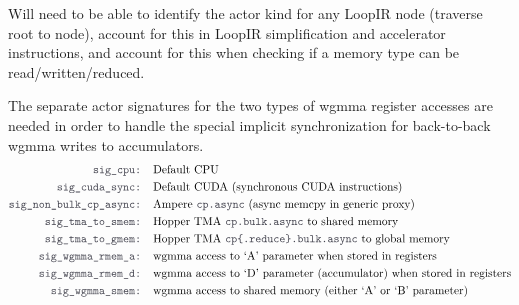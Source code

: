 \filbreak
{} Will need to be able to identify the actor kind for any LoopIR node (traverse root to node), account for this in LoopIR simplification and accelerator instructions, and account for this when checking if a memory type can be read/written/reduced.

\filbreak
{} The separate actor signatures for the two types of wgmma register accesses are needed in order to handle the special implicit synchronization for back-to-back wgmma writes to accumulators.
\begin{align*}
\lighttt{sig\_cpu: } & \text{Default CPU}\\
\lighttt{sig\_cuda\_sync: } & \text{Default CUDA (synchronous CUDA instructions)}\\
\lighttt{sig\_non\_bulk\_cp\_async: } & \text{Ampere \lighttt{cp.async} (async memcpy in generic proxy)}\\
\lighttt{sig\_tma\_to\_smem: } & \text{Hopper TMA \lighttt{cp.bulk.async} to shared memory}\\
\lighttt{sig\_tma\_to\_gmem: } & \text{Hopper TMA \lighttt{cp\{.reduce\}.bulk.async} to global memory}\\
\lighttt{sig\_wgmma\_rmem\_a: } & \text{wgmma access to `A' parameter when stored in registers}\\
\lighttt{sig\_wgmma\_rmem\_d: } & \text{wgmma access to `D' parameter (accumulator) when stored in registers}\\
\lighttt{sig\_wgmma\_smem: } & \text{wgmma access to shared memory (either `A' or `B' parameter)}
\end{align*}

